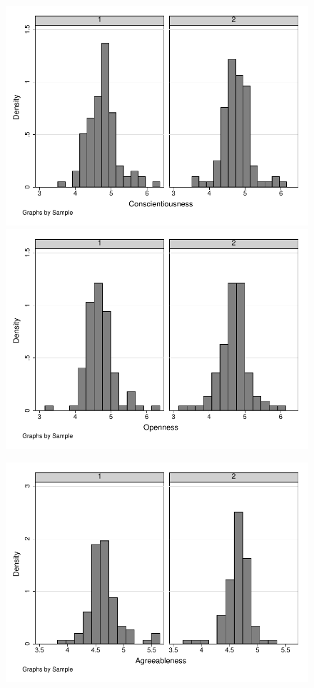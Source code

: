 \documentclass[12pt]{article}%
\begin{document}
\begin{figure}[htpb]
	\centering
	\includegraphics[]{conscientiousness.pdf}
	\includegraphics[]{openness.pdf}
\end{figure}
\begin{figure}[htpb]
	\centering
	\includegraphics[]{agreeableness.pdf}
\end{figure}
\clearpage
\end{document}
